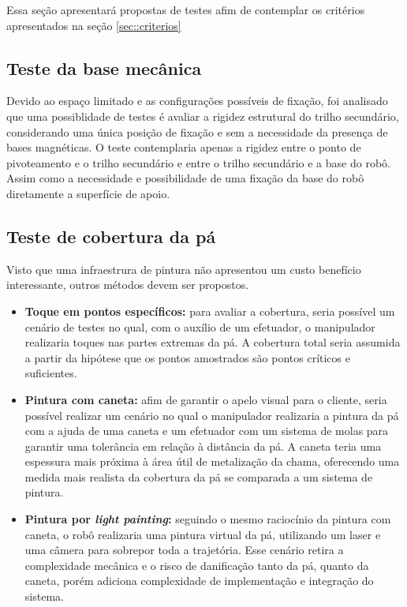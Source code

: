 Essa seção apresentará propostas de testes afim de contemplar os critérios
apresentados na seção \ref{sec::criterios}

\subsection{Teste da base mecânica}
Devido ao espaço limitado e as configurações
possíveis de fixação, foi analisado que uma possiblidade de testes é avaliar a rigidez estrutural do trilho secundário, 
considerando uma única posição de fixação e sem a necessidade da presença de bases magnéticas. 
O teste contemplaria apenas a rigidez entre o ponto de pivoteamento e o trilho secundário e entre o 
trilho secundário e a base do robô. Assim como a necessidade e possibilidade de uma fixação da base do 
robô diretamente a superfície de apoio.



\subsection{Teste de cobertura da pá}

Visto que uma infraestrura de pintura não apresentou um custo benefício
interessante, outros métodos devem ser propostos.

\begin{itemize}
  \item \textbf{Toque em pontos específicos:} para avaliar a cobertura, seria
  possível um cenário de testes no qual, com o auxílio de um efetuador, o
  manipulador realizaria toques nas partes extremas da pá. A cobertura total
  seria assumida a partir da hipótese que os pontos amostrados são  pontos
  críticos e suficientes.
  \item  \textbf{Pintura com caneta:} afim de garantir o apelo visual para o
  cliente, seria possível realizar um cenário no qual o manipulador realizaria a
  pintura da pá com a ajuda de uma caneta e um efetuador com um sistema de molas
  para garantir uma tolerância em relação à distância da pá. A caneta teria uma
  espessura mais próxima à área útil de metalização da chama, oferecendo uma
  medida mais realista da cobertura da pá se comparada a um sistema de
  pintura.
  \item \textbf{Pintura por \textit{light painting}:} seguindo o mesmo
  raciocínio da pintura com caneta, o robô realizaria uma pintura virtual da pá,
  utilizando um laser e uma câmera para sobrepor toda a trajetória. Esse cenário
  retira a complexidade mecânica e o risco de danificação tanto da pá, quanto da
  caneta, porém adiciona complexidade de implementação e integração do sistema.
\end{itemize}

